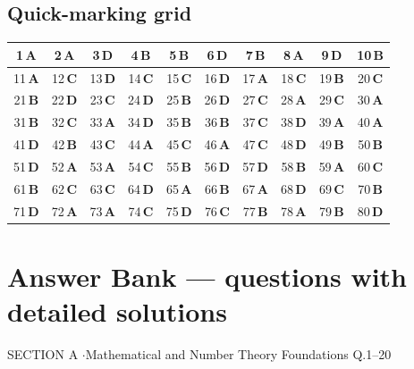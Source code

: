 \documentclass[11pt,a4paper]{article}
\begin{document}
\subsection*{Quick-marking grid}
\begin{center}\renewcommand{\arraystretch}{1.3}
\begin{tabular}{|c|c|c|c|c|c|c|c|c|c|}\hline
1\,\textbf{A} & 2\,\textbf{A} & 3\,\textbf{D} & 4\,\textbf{B} & 5\,\textbf{B} & 6\,\textbf{D} & 7\,\textbf{B} & 8\,\textbf{A} & 9\,\textbf{D} & 10\,\textbf{B} \\
\hline
11\,\textbf{A} & 12\,\textbf{C} & 13\,\textbf{D} & 14\,\textbf{C} & 15\,\textbf{C} & 16\,\textbf{D} & 17\,\textbf{A} & 18\,\textbf{C} & 19\,\textbf{B} & 20\,\textbf{C} \\
\hline
21\,\textbf{B} & 22\,\textbf{D} & 23\,\textbf{C} & 24\,\textbf{D} & 25\,\textbf{B} & 26\,\textbf{D} & 27\,\textbf{C} & 28\,\textbf{A} & 29\,\textbf{C} & 30\,\textbf{A} \\
\hline
31\,\textbf{B} & 32\,\textbf{C} & 33\,\textbf{A} & 34\,\textbf{D} & 35\,\textbf{B} & 36\,\textbf{B} & 37\,\textbf{C} & 38\,\textbf{D} & 39\,\textbf{A} & 40\,\textbf{A} \\
\hline
41\,\textbf{D} & 42\,\textbf{B} & 43\,\textbf{C} & 44\,\textbf{A} & 45\,\textbf{C} & 46\,\textbf{A} & 47\,\textbf{C} & 48\,\textbf{D} & 49\,\textbf{B} & 50\,\textbf{B} \\
\hline
51\,\textbf{D} & 52\,\textbf{A} & 53\,\textbf{A} & 54\,\textbf{C} & 55\,\textbf{B} & 56\,\textbf{D} & 57\,\textbf{D} & 58\,\textbf{B} & 59\,\textbf{A} & 60\,\textbf{C} \\
\hline
61\,\textbf{B} & 62\,\textbf{C} & 63\,\textbf{C} & 64\,\textbf{D} & 65\,\textbf{A} & 66\,\textbf{B} & 67\,\textbf{A} & 68\,\textbf{D} & 69\,\textbf{C} & 70\,\textbf{B} \\
\hline
71\,\textbf{D} & 72\,\textbf{A} & 73\,\textbf{A} & 74\,\textbf{C} & 75\,\textbf{D} & 76\,\textbf{C} & 77\,\textbf{B} & 78\,\textbf{A} & 79\,\textbf{B} & 80\,\textbf{D} \\
\hline\end{tabular}\end{center}
\newpage
\section*{Answer Bank --- questions with detailed solutions}\label{bank}

\begin{sectionbanner}SECTION A \enspace$\cdot$\enspace Mathematical and Number Theory Foundations \hfill Q.1--20\end{sectionbanner}
\end{document}
